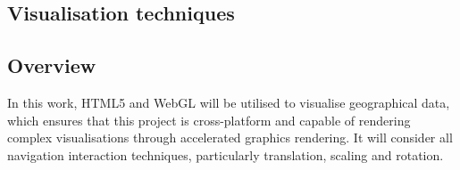 \documentclass[
	fontsize=11pt
	headlines=2,
	footlines=2,
	parskip=half
]{scrartcl}
\begin{document}
{{		}




		\subsection{Visualisation techniques} {


		}

		\subsection{Overview} {


			In this work, HTML5 and WebGL will be utilised to visualise geographical data, which ensures that this project is cross-platform and capable of rendering complex visualisations through accelerated graphics rendering. It will consider all navigation interaction techniques, particularly translation, scaling and rotation.

		}
	
	}
	
	\newpage
	
\end{document}
